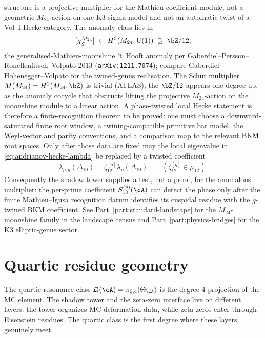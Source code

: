 \begin{remark}
structure is a projective multiplier for the Mathieu coefficient
module, not a geometric $M_{24}$ action on one K3 sigma model and
not an automatic twist of a Vol~I Hecke category. The anomaly
class lies in
\begin{equation}\label{eq:m24-schur-multiplier}
 [\chi^{M_{24}}_g]
 \;\in\;
 H^3(M_{24}, \mathrm{U}(1))
 \;\supseteq\;
 \bZ / 12,
\end{equation}
the generalised-Mathieu-moonshine 't~Hooft anomaly per
Gaberdiel--Persson--Ronellenfitsch--Volpato 2013
(\texttt{arXiv:1211.7074}); compare
Gaberdiel--Hohenegger--Volpato \cite{GaberdielHoheneggerVolpato2012}
for the twined-genus realisation. The Schur multiplier
$M(M_{24}) = H^2(M_{24}, \bZ)$ is trivial (ATLAS); the $\bZ/12$
appears one degree up, as the anomaly cocycle that obstructs lifting
the projective $M_{24}$-action on the moonshine module to a linear
action. A phase-twisted local Hecke statement is therefore a
finite-recognition theorem to be proved: one must choose a
downward-saturated finite root window, a twining-compatible primitive
bar model, the Weyl-vector and parity conventions, and a comparison
map to the relevant BKM root spaces. Only after those data are fixed
may the local eigenvalue in \eqref{eq:andrianov-hecke-lambda} be
replaced by a twisted coefficient
\[
 \lambda_{p,g}(\Delta_{10})
 =
 \zeta_{12}^{[g]}\lambda_p(\Delta_{10})
 \qquad
 (\zeta_{12}^{[g]}\in\mu_{12}).
\]
Consequently the shadow tower supplies a test, not a proof, for the
anomalous multiplier: the per-prime coefficient
$S^{(p)}_{10}(\cA)$ can detect the phase only after the finite
Mathieu--Igusa recognition datum identifies its cuspidal residue with
the $g$-twined BKM coefficient.
See Part~\ref{part:standard-landscape} for the $M_{24}$-moonshine
family in the landscape census and Part~\ref{part:physics-bridges}
for the K3 elliptic-genus sector.
\end{remark}

\section{Quartic residue geometry}%
\label{sec:quartic-residue-theory}%

The quartic resonance class
$\mathfrak{Q}(\cA) = \pi_{0,4}(\Theta_\cA)$
is the degree-$4$ projection of the MC element.
The shadow tower and the zeta-zero interface live on different
layers: the tower organizes MC deformation data,
while zeta zeros enter through Eisenstein residues.
The quartic class is the first degree where these layers genuinely
meet.

